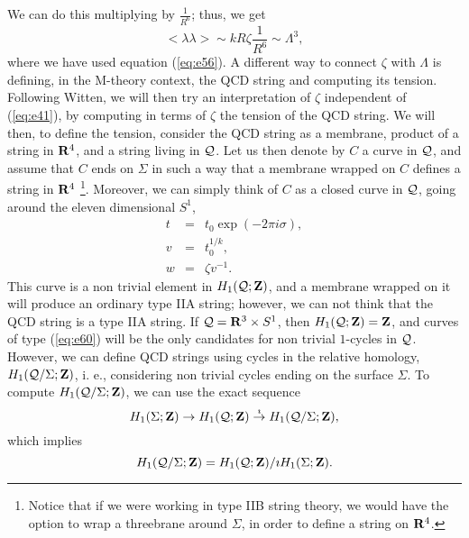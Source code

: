 We can do this multiplying by $\frac {1}{R^6}$; thus, we get
\begin{equation}
<\lambda \lambda> \sim k R \zeta \frac {1}{R^6} \sim \Lambda^3,
\end{equation}
where we have used equation (\ref{eq:e56}). A different 
way to connect $\zeta$ with $\Lambda$ is defining, in the M-theory context, 
the QCD string and computing its tension. Following Witten, we will then try an interpretation of $\zeta$ 
independent of (\ref{eq:e41}), by computing in terms of $\zeta$ the tension 
of the QCD string. We will then, to define the tension, consider the QCD string as a membrane, 
product of a string in ${\bf R}^4$, and a string living in ${\cal Q}$. Let us then 
denote by $C$ a curve in ${\cal Q}$, and assume that $C$ ends on $\Sigma$ in 
such a way that a membrane wrapped on $C$ defines a string in ${\bf R}^4$  \footnote{Notice 
that if we were working in type IIB string theory, we would have the option to 
wrap a threebrane around $\Sigma$, in order to define a string on ${\bf R}^4$.}. Moreover, 
we can simply think of $C$ as a closed curve in ${\cal Q}$, going around the 
eleven dimensional $S^1$,
\begin{eqnarray}
t & = & t_0 \exp (-2 \pi i \sigma), \nonumber \\
v & = & t_0^{1/k}, \nonumber \\
w & = & \zeta v^{-1}.
\label{eq:e60}
\end{eqnarray}
This curve is a non trivial element in $H_1({\cal Q}; {\bf Z})$, and a 
membrane wrapped on it will produce an ordinary type IIA string; however, we 
can not think that the QCD string is a type IIA string. If ${\cal Q} = {\bf R}^3 
\times S^1$, then $H_1({\cal Q};{\bf Z}) = {\bf Z}$, and curves of type 
(\ref{eq:e60}) will be the only candidates for non trivial $1$-cycles in 
${\cal Q}$. However, we can define QCD strings using cycles in the relative 
homology, $H_1({\cal Q}/\Sigma; {\bf Z})$, i. e., considering non trivial 
cycles ending on the surface $\Sigma$. To compute $H_1({\cal Q}/\Sigma; 
{\bf Z})$, we can use the exact sequence
\begin{equation}
H_1(\Sigma;{\bf Z}) \rightarrow H_1({\cal Q};{\bf Z}) \stackrel{\imath}{\rightarrow} 
H_1({\cal Q}/\Sigma; {\bf Z}),
\label{eq:e61}
\end{equation}
which implies
\begin{equation}
H_1({\cal Q}/\Sigma;{\bf Z}) = H_1({\cal Q};{\bf Z})/ \imath H_1(\Sigma;{\bf Z}).
\label{eq:e62}
\end{equation}
